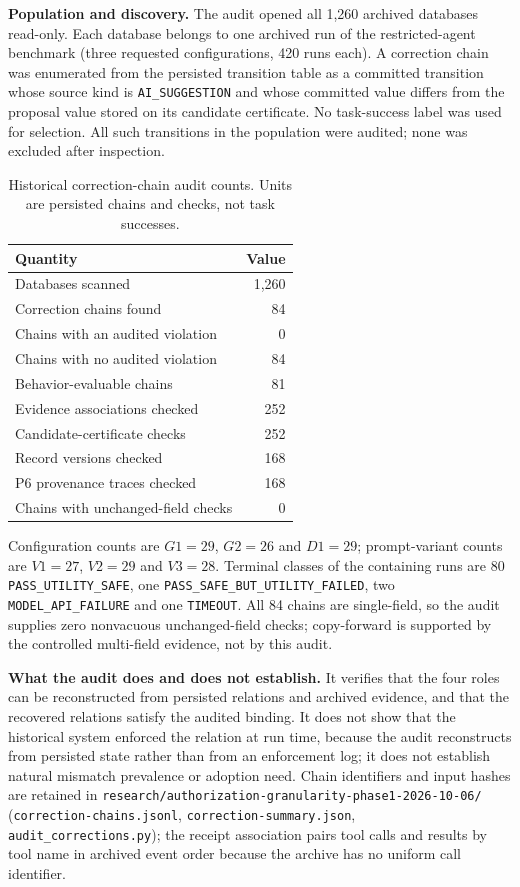 \documentclass[10pt,a4paper]{article}
\begin{document}
\textbf{Population and discovery.} The audit opened all 1,260 archived databases read-only. Each database belongs to one archived run of the restricted-agent benchmark (three requested configurations, 420 runs each). A correction chain was enumerated from the persisted transition table as a committed transition whose source kind is \texttt{AI\_SUGGESTION} and whose committed value differs from the proposal value stored on its candidate certificate. No task-success label was used for selection. All such transitions in the population were audited; none was excluded after inspection.

\begin{table}[htbp]
\centering\small
\caption{Historical correction-chain audit counts. Units are persisted chains and checks, not task successes.}
\begin{tabular}{lr}
\toprule
Quantity & Value \\
\midrule
Databases scanned & 1,260 \\
Correction chains found & 84 \\
Chains with an audited violation & 0 \\
Chains with no audited violation & 84 \\
Behavior-evaluable chains & 81 \\
Evidence associations checked & 252 \\
Candidate-certificate checks & 252 \\
Record versions checked & 168 \\
P6 provenance traces checked & 168 \\
Chains with unchanged-field checks & 0 \\
\bottomrule
\end{tabular}
\end{table}

Configuration counts are $G1=29$, $G2=26$ and $D1=29$; prompt-variant counts are $V1=27$, $V2=29$ and $V3=28$. Terminal classes of the containing runs are 80 \texttt{PASS\_UTILITY\_SAFE}, one \texttt{PASS\_SAFE\_BUT\_UTILITY\_FAILED}, two \texttt{MODEL\_API\_FAILURE} and one \texttt{TIMEOUT}. All 84 chains are single-field, so the audit supplies zero nonvacuous unchanged-field checks; copy-forward is supported by the controlled multi-field evidence, not by this audit.

\textbf{What the audit does and does not establish.} It verifies that the four roles can be reconstructed from persisted relations and archived evidence, and that the recovered relations satisfy the audited binding. It does not show that the historical system enforced the relation at run time, because the audit reconstructs from persisted state rather than from an enforcement log; it does not establish natural mismatch prevalence or adoption need. Chain identifiers and input hashes are retained in \nolinkurl{research/authorization-granularity-phase1-2026-10-06/} (\texttt{correction-chains.jsonl}, \texttt{correction-summary.json}, \texttt{audit\_corrections.py}); the receipt association pairs tool calls and results by tool name in archived event order because the archive has no uniform call identifier.
\end{document}
